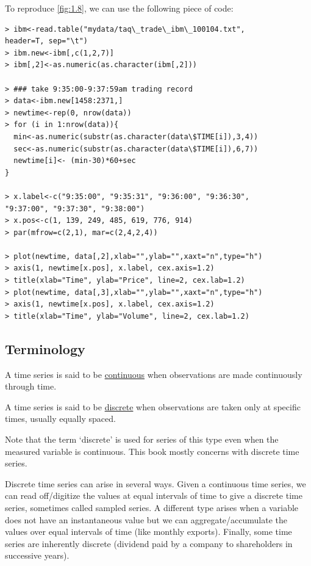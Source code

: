 \newpage
To reproduce \cref{fig:1.8}, we can use the following piece of code:
\begin{verbatim}
> ibm<-read.table("mydata/taq\_trade\_ibm\_100104.txt",
header=T, sep="\t")
> ibm.new<-ibm[,c(1,2,7)]
> ibm[,2]<-as.numeric(as.character(ibm[,2]))

> ### take 9:35:00-9:37:59am trading record
> data<-ibm.new[1458:2371,]
> newtime<-rep(0, nrow(data))
> for (i in 1:nrow(data)){
  min<-as.numeric(substr(as.character(data\$TIME[i]),3,4))
  sec<-as.numeric(substr(as.character(data\$TIME[i]),6,7))
  newtime[i]<- (min-30)*60+sec
}

> x.label<-c("9:35:00", "9:35:31", "9:36:00", "9:36:30",
"9:37:00", "9:37:30", "9:38:00")
> x.pos<-c(1, 139, 249, 485, 619, 776, 914)
> par(mfrow=c(2,1), mar=c(2,4,2,4))

> plot(newtime, data[,2],xlab="",ylab="",xaxt="n",type="h")
> axis(1, newtime[x.pos], x.label, cex.axis=1.2)
> title(xlab="Time", ylab="Price", line=2, cex.lab=1.2)
> plot(newtime, data[,3],xlab="",ylab="",xaxt="n",type="h")
> axis(1, newtime[x.pos], x.label, cex.axis=1.2)
> title(xlab="Time", ylab="Volume", line=2, cex.lab=1.2)
\end{verbatim}



\subsection{Terminology}
\begin{definition*}[]
A time series is said to be \underline{continuous} when observations are made continuously through time.

A time series is said to be \underline{discrete} when observations are taken only at specific times, usually equally spaced.
\end{definition*}
Note that the term `discrete' is used for series of this type even when the measured variable is continuous. This book mostly concerns with discrete time series.

Discrete time series can arise in several ways. Given a continuous time series, we can read off/digitize the values at equal intervals of time to give a discrete time series, sometimes called sampled series. A different type arises when a variable does not have an instantaneous value but we can aggregate/accumulate the values over equal intervals of time (like monthly exports). Finally, some time series are inherently discrete (dividend paid by a company to shareholders in successive years).

